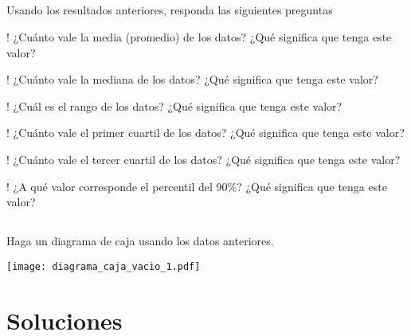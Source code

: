 \documentclass{cdplf-prueba}
\begin{document}
\subsection{}
Usando los resultados anteriores, responda las siguientes preguntas
\begin{tasks}[label={\tcbox[colback=black!60, colframe=black!60, coltext=white, on line, boxsep=0pt, left=3pt, right=3pt, top=2pt, bottom=2pt]{\sffamily\bfseries\alph*}},
item-indent=1.2cm,column-sep=20pt,label-offset=0.3cm,label-width=15pt,after-item-skip=10pt]
    \task! ¿Cuánto vale la media (promedio) de los datos? ¿Qué significa que tenga este valor? \begin{lineas}[height=1.5cm]\end{lineas}
    \task! ¿Cuánto vale la mediana de los datos? ¿Qué significa que tenga este valor? \begin{lineas}[height=1.5cm]\end{lineas}
    \task! ¿Cuál es el rango de los datos? ¿Qué significa que tenga este valor? \begin{lineas}[height=1.5cm]\end{lineas}
    \task! ¿Cuánto vale el primer cuartil de los datos? ¿Qué significa que tenga este valor? \begin{lineas}[height=1.5cm]\end{lineas}
    \task! ¿Cuánto vale el tercer cuartil de los datos? ¿Qué significa que tenga este valor? \begin{lineas}[height=1.5cm]\end{lineas}
    \task! ¿A qué valor corresponde el percentil del 90\%? ¿Qué significa que tenga este valor? \begin{lineas}[height=1.5cm]\end{lineas}
\end{tasks}
\subsection{}

Haga un diagrama de caja usando los datos anteriores.
\begin{center}\texttt{[image: diagrama\_caja\_vacio\_1.pdf]}\end{center}

\newpage\section*{Soluciones}
\setcounter{subsection}{0}
\subsection{}
\end{document}
